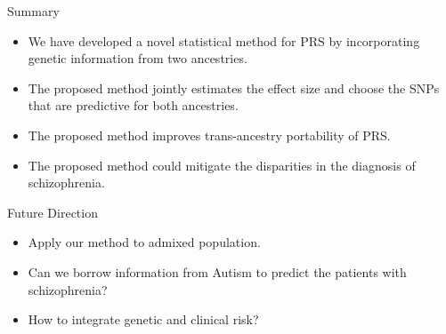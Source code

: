 \documentclass{beamer}
\begin{document}







    

\begin{frame}{Summary}
    \begin{itemize}
        \item We have developed a novel statistical method for PRS by incorporating genetic information from two ancestries.
        \item The proposed method jointly estimates the effect size and choose the SNPs that are predictive for both ancestries.
        \item The proposed method improves trans-ancestry portability of PRS.
        \item The proposed method could mitigate the disparities in the diagnosis of schizophrenia.
    \end{itemize}
\end{frame}

\begin{frame}{Future Direction}
\begin{itemize}
    \item Apply our method to admixed population.
    \item Can we borrow information from Autism to predict the patients with schizophrenia? 
    \item How to integrate genetic and clinical risk?
\end{itemize}
\end{frame}
\end{document}
